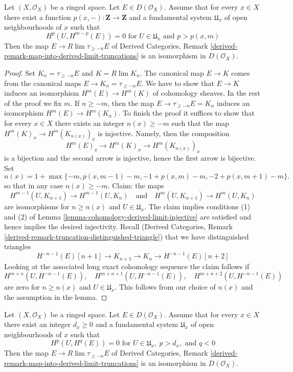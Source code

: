 \begin{lemma}
\label{lemma-is-limit-per-point}
Let $(X, \mathcal{O}_X)$ be a ringed space. Let $E \in D(\mathcal{O}_X)$.
Assume that for every $x \in X$ there exist
a function $p(x, -) : \mathbf{Z} \to \mathbf{Z}$ and
a fundamental system $\mathfrak{U}_x$ of open neighbourhoods of $x$
such that
$$
H^p(U, H^{m - p}(E)) = 0 \text{ for }
U \in \mathfrak{U}_x \text{ and } p > p(x, m)
$$
Then the map $E \to R\lim \tau_{\geq -n} E$ of
Derived Categories, Remark
\ref{derived-remark-map-into-derived-limit-truncations}
is an isomorphism in $D(\mathcal{O}_X)$.
\end{lemma}

\begin{proof}
Set $K_n = \tau_{\geq -n}E$ and $K = R\lim K_n$.
The canonical map $E \to K$
comes from the canonical maps $E \to K_n = \tau_{\geq -n}E$.
We have to show that $E \to K$ induces an isomorphism
$H^m(E) \to H^m(K)$ of cohomology sheaves. In the rest of the
proof we fix $m$. If $n \geq -m$, then
the map $E \to \tau_{\geq -n}E = K_n$ induces an isomorphism
$H^m(E) \to H^m(K_n)$.
To finish the proof it suffices to show that for every $x \in X$
there exists an integer $n(x) \geq -m$ such that the map
$H^m(K)_x \to H^m(K_{n(x)})_x$ is injective. Namely, then
the composition
$$
H^m(E)_x \to H^m(K)_x \to H^m(K_{n(x)})_x
$$
is a bijection and the second arrow is injective, hence the
first arrow is bijective. Set
$$
n(x) = 1 + \max\{-m, p(x, m - 1) - m, -1 + p(x, m) - m, -2 + p(x, m + 1) - m\}.
$$
so that in any case $n(x) \geq -m$. Claim: the maps
$$
H^{m - 1}(U, K_{n + 1}) \to H^{m - 1}(U, K_n)
\quad\text{and}\quad
H^m(U, K_{n + 1}) \to H^m(U, K_n)
$$
are isomorphisms for $n \geq n(x)$ and $U \in \mathfrak{U}_x$.
The claim implies conditions
(1) and (2) of Lemma \ref{lemma-cohomology-derived-limit-injective}
are satisfied and hence implies the desired injectivity.
Recall (Derived Categories, Remark
\ref{derived-remark-truncation-distinguished-triangle})
that we have distinguished triangles
$$
H^{-n - 1}(E)[n + 1] \to
K_{n + 1} \to K_n \to H^{-n - 1}(E)[n + 2]
$$
Looking at the associated long exact cohomology sequence the claim follows if
$$
H^{m + n}(U, H^{-n - 1}(E)),\quad
H^{m + n + 1}(U, H^{-n - 1}(E)),\quad
H^{m + n + 2}(U, H^{-n - 1}(E))
$$
are zero for $n \geq n(x)$ and $U \in \mathfrak{U}_x$.
This follows from our choice of $n(x)$
and the assumption in the lemma.
\end{proof}

\begin{lemma}
\label{lemma-is-limit-spaltenstein}
\begin{reference}
\cite[Proposition 3.13]{Spaltenstein}
\end{reference}
Let $(X, \mathcal{O}_X)$ be a ringed space. Let $E \in D(\mathcal{O}_X)$.
Assume that for every $x \in X$ there exist an integer $d_x \geq 0$ and
a fundamental system $\mathfrak{U}_x$ of open neighbourhoods of $x$
such that
$$
H^p(U, H^q(E)) = 0 \text{ for }
U \in \mathfrak{U}_x,\ p > d_x, \text{ and }q < 0
$$
Then the map $E \to R\lim \tau_{\geq -n} E$ of
Derived Categories, Remark
\ref{derived-remark-map-into-derived-limit-truncations}
is an isomorphism in $D(\mathcal{O}_X)$.
\end{lemma}

